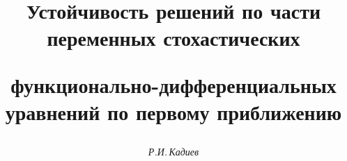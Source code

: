 

 


% 


\newcommand{\la}{\langle} 


\newcommand{\ra}{\rangle} 


\newcommand{\eqdef}{\overset{\mathrm{def}}{=}{}} 


\newcommand{\col}{\operatorname{col}} 


\newcommand{\diag}{\operatorname{diag}} 


\newcommand{\vraisup}{\operatornamewithlimits{vrai~sup}} 


\newcommand{\tts}[1]{} 


\renewcommand{\baselinestretch}{1.03}


 




\setcounter{page}{30} 












 


\author{\it Р.И.\,Кадиев} 




\title{Устойчивость решений по части переменных стохастических 


функционально-дифференциальных уравнений по первому приближению} 


 


\date{} 





